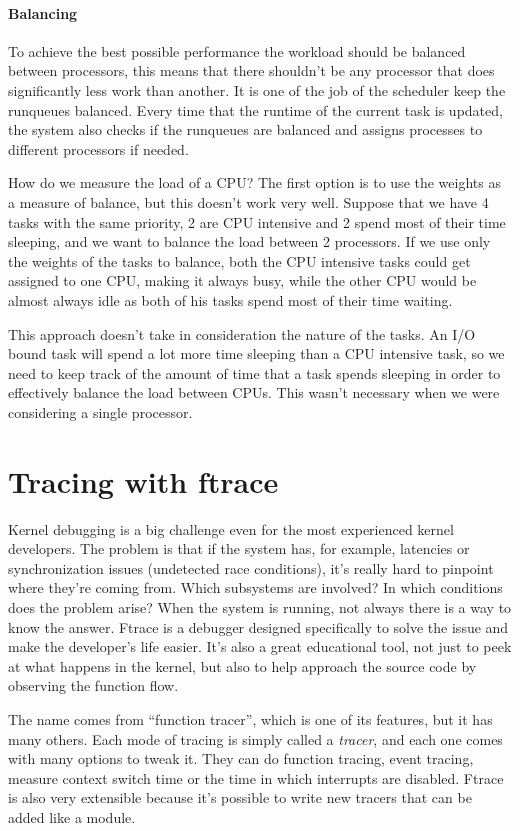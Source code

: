 \documentclass[10pt]{book}
\begin{document}
\subsubsection{Balancing}

To achieve the best possible performance the workload should be balanced between processors, this means that there shouldn't be any processor that does significantly less work than another. It is one of the job of the scheduler keep the runqueues balanced. Every time that the runtime of the current task is updated, the system also checks if the runqueues are balanced and assigns processes to different processors if needed. 

How do we measure the load of a CPU? The first option is to use the weights as a measure of balance, but this doesn't work very well. Suppose that we have 4 tasks with the same priority, 2 are CPU intensive and 2 spend most of their time sleeping, and we want to balance the load between 2 processors. If we use only the weights of the tasks to balance, both the CPU intensive tasks could get assigned to one CPU, making it always busy, while the other CPU would be almost always idle as both of his tasks spend most of their time waiting.

This approach doesn't take in consideration the nature of the tasks. An I/O bound task will spend a lot more time sleeping than a CPU intensive task, so we need to keep track of the amount of time that a task spends sleeping in order to effectively balance the load between CPUs. This wasn't necessary when we were considering a single processor. 


\chapter{Tracing with ftrace} 
\label{chap:ftrace}
Kernel debugging is a big challenge even for the most experienced kernel developers. The problem is that if the system has, for example, latencies or synchronization issues (undetected race conditions), it's really hard to pinpoint where they're coming from. Which subsystems are involved? In which conditions does the problem arise? When the system is running, not always there is a way to know the answer. Ftrace is a debugger designed specifically to solve the issue and make the developer's life easier. It's also a great educational tool, not just to peek at what happens in the kernel, but also to help approach the source code by observing the function flow.

The name comes from ``function tracer'', which is one of its features, but it has many others. Each mode of tracing is simply called a \textit{tracer}, and each one comes with many options to tweak it. They can do function tracing, event tracing, measure context switch time or the time in which interrupts are disabled. Ftrace is also very extensible because it's possible to write new tracers that can be added like a module.
\end{document}
